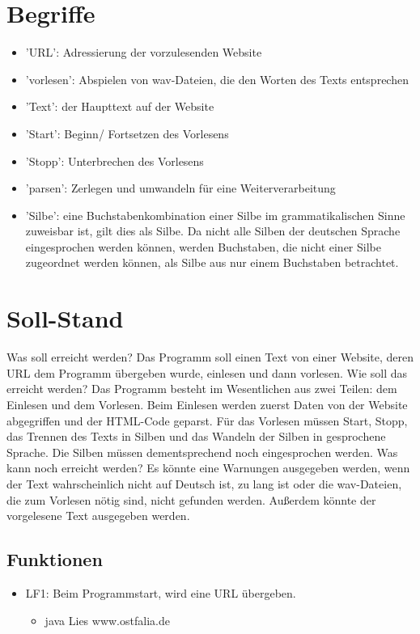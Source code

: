 \documentclass[12pt]{scrartcl}
\begin{document}
\section{Begriffe}
\begin{itemize}
    \item 'URL': Adressierung der vorzulesenden Website
    \item 'vorlesen': Abspielen von wav-Dateien, die den Worten des Texts entsprechen
    \item 'Text': der Haupttext auf der Website
    \item 'Start': Beginn/ Fortsetzen des Vorlesens
    \item 'Stopp': Unterbrechen des Vorlesens
    \item 'parsen': Zerlegen und umwandeln für eine Weiterverarbeitung
    \item 'Silbe': eine Buchstabenkombination einer Silbe im grammatikalischen Sinne zuweisbar ist, gilt dies als Silbe. Da nicht alle Silben der deutschen Sprache eingesprochen werden können, werden Buchstaben, die nicht                 einer Silbe zugeordnet werden können, als Silbe aus nur einem Buchstaben betrachtet.
\end{itemize}

\section{Soll-Stand}
Was soll erreicht werden?
Das Programm soll einen Text von einer Website, deren URL dem Programm übergeben wurde, einlesen und dann vorlesen.
Wie soll das erreicht werden?
Das Programm besteht im Wesentlichen aus zwei Teilen: dem Einlesen und dem Vorlesen. Beim Einlesen werden zuerst Daten von der Website abgegriffen und der HTML-Code geparst. Für das Vorlesen müssen Start, Stopp, das Trennen des Texts in Silben und das Wandeln der Silben in gesprochene Sprache. Die Silben müssen dementsprechend noch eingesprochen werden.
Was kann noch erreicht werden?
Es könnte eine Warnungen ausgegeben werden, wenn der Text wahrscheinlich nicht auf Deutsch ist, zu lang ist oder die wav-Dateien, die zum Vorlesen nötig sind, nicht gefunden werden. Außerdem könnte der vorgelesene Text ausgegeben werden.


\subsection{Funktionen}

\begin{itemize}
	\item LF1: Beim Programmstart, wird eine URL übergeben.
\begin{itemize}
	\item java Lies www.ostfalia.de
\end{itemize}
\end{itemize}
\end{document}
